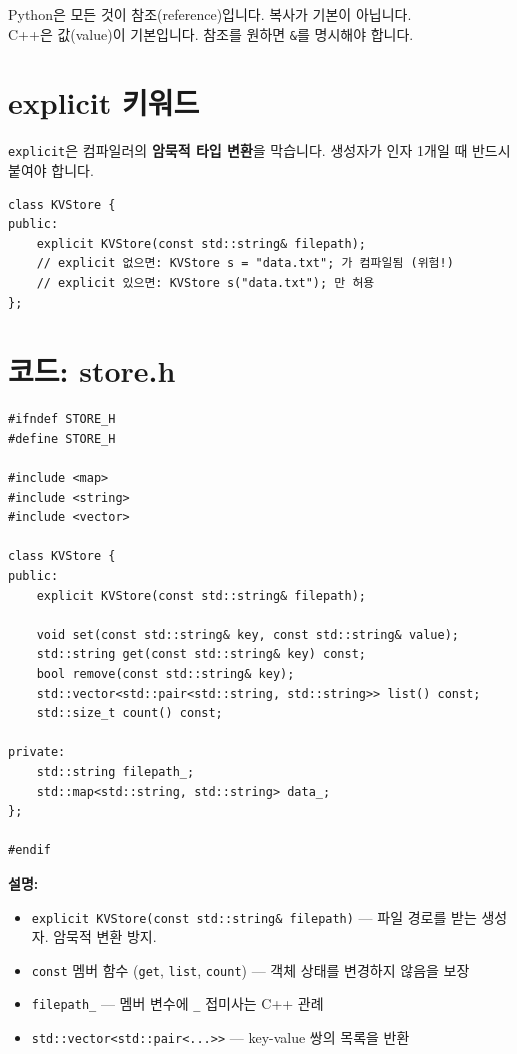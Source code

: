 \documentclass[11pt,a4paper]{book}
\newcommand{\file}[1]{\texttt{#1}}
\newcommand{\code}[1]{\texttt{#1}}
\begin{document}
\begin{pythonbox}
Python은 모든 것이 참조(reference)입니다. 복사가 기본이 아닙니다.\\
C++은 값(value)이 기본입니다. 참조를 원하면 \code{\&}를 명시해야 합니다.
\end{pythonbox}

\section{explicit 키워드}

\code{explicit}은 컴파일러의 \textbf{암묵적 타입 변환}을 막습니다. 생성자가 인자 1개일 때 반드시 붙여야 합니다.

\begin{lstlisting}[style=cpp]
class KVStore {
public:
    explicit KVStore(const std::string& filepath);
    // explicit 없으면: KVStore s = "data.txt"; 가 컴파일됨 (위험!)
    // explicit 있으면: KVStore s("data.txt"); 만 허용
};
\end{lstlisting}

\section{코드: store.h}

\begin{lstlisting}[style=cpp,title={\file{src/store.h}}]
#ifndef STORE_H
#define STORE_H

#include <map>
#include <string>
#include <vector>

class KVStore {
public:
    explicit KVStore(const std::string& filepath);

    void set(const std::string& key, const std::string& value);
    std::string get(const std::string& key) const;
    bool remove(const std::string& key);
    std::vector<std::pair<std::string, std::string>> list() const;
    std::size_t count() const;

private:
    std::string filepath_;
    std::map<std::string, std::string> data_;
};

#endif
\end{lstlisting}

\textbf{설명:}
\begin{itemize}[nosep]
\item \code{explicit KVStore(const std::string\& filepath)} — 파일 경로를 받는 생성자. 암묵적 변환 방지.
\item \code{const} 멤버 함수 (\code{get}, \code{list}, \code{count}) — 객체 상태를 변경하지 않음을 보장
\item \code{filepath\_} — 멤버 변수에 \code{\_} 접미사는 C++ 관례
\item \code{std::vector<std::pair<...>>} — key-value 쌍의 목록을 반환
\end{itemize}
\end{document}
